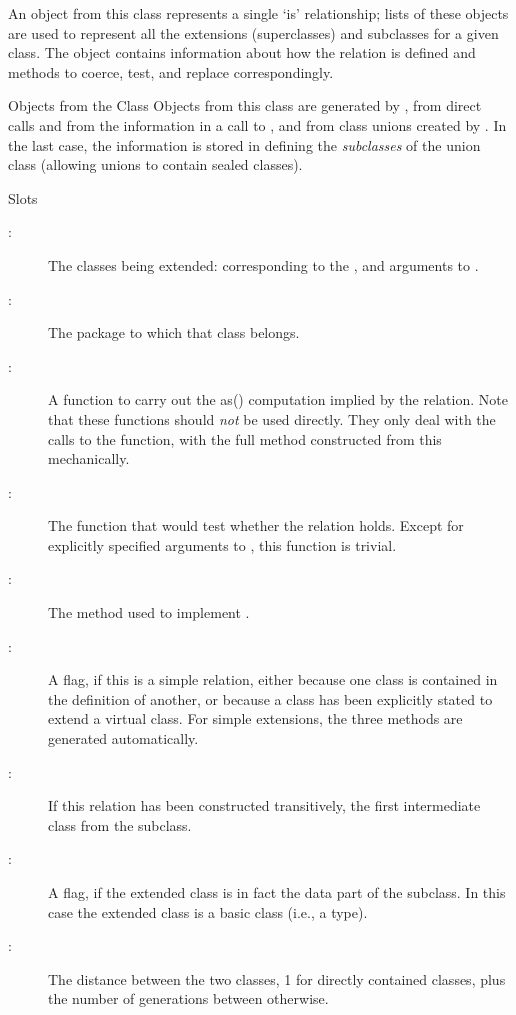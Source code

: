 %
\begin{Description}\relax
  An object from this class represents a single `is'
relationship; lists of these objects are used to represent all the
extensions (superclasses) and subclasses for a given class.  The
object contains information about how the relation is defined and
methods to coerce, test, and replace correspondingly. 
\end{Description}
%
\begin{Section}{Objects from the Class}
Objects from this class are generated by ,
from direct calls and from the  information in a call to , and from class unions created by .
In the last case, the information is stored in defining the \emph{subclasses} of the union class (allowing unions to contain sealed classes).
\end{Section}
%
\begin{Section}{Slots}
\begin{description}

\item[:] The classes being extended:
corresponding to the , and  arguments to . 
\item[:] The package to which that class belongs. 
\item[:] A function to carry out the as() computation
implied by the relation.  Note that these functions should
\emph{not} be used directly.  They only deal with the
 calls to the  function, with
the full method constructed from this mechanically. 
\item[:] The function that would test whether the
relation holds.  Except for explicitly specified 
arguments to , this function is trivial. 
\item[:] The method used to implement .
\item[:] A  flag,  if this
is a simple relation, either because one class is contained in the
definition of another, or because a class has been explicitly
stated to extend a virtual class.  For simple extensions, the
three methods are generated automatically.
\item[:] If this relation has been constructed
transitively, the first intermediate class from the subclass. 
\item[:] A  flag,  if
the extended class is in fact the data part of the subclass.  In
this case the extended class is a basic class (i.e., a type). 
\item[:] The distance between the two classes,
1 for directly contained classes, plus the number of generations between otherwise.  
\end{description}

\end{Section}
